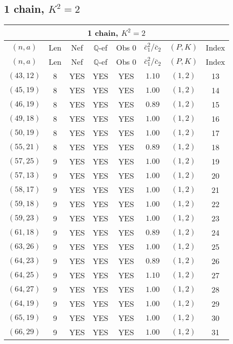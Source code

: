 \subsection{1 chain, $K^2 = 2$}
\begin{longtable}{|c|c|c|c|c|c|c|c|}
\hline
\multicolumn{8}{|c|}{1 chain, $K^2 = 2$}\\
\hline
$(n,a)$ & Len & Nef & $\mathbb Q$-ef & Obs 0 & $\overline c_1^2 / \overline c_2$ & $(P,K)$ & Index\\
\hline
\endfirsthead

\hline
$(n,a)$ & Len & Nef & $\mathbb Q$-ef & Obs 0 & $\overline c_1^2 / \overline c_2$ & $(P,K)$ & Index\\
\hline
\endhead
\hline
\endfoot

$(43,12)$ & 8 & YES & YES & YES & $1.10$ & $(1,2)$ & 13\\
$(45,19)$ & 8 & YES & YES & YES & $1.00$ & $(1,2)$ & 14\\
$(46,19)$ & 8 & YES & YES & YES & $0.89$ & $(1,2)$ & 15\\
$(49,18)$ & 8 & YES & YES & YES & $1.00$ & $(1,2)$ & 16\\
$(50,19)$ & 8 & YES & YES & YES & $1.00$ & $(1,2)$ & 17\\
$(55,21)$ & 8 & YES & YES & YES & $0.89$ & $(1,2)$ & 18\\
$(57,25)$ & 9 & YES & YES & YES & $1.00$ & $(1,2)$ & 19\\
$(57,13)$ & 9 & YES & YES & YES & $1.00$ & $(1,2)$ & 20\\
$(58,17)$ & 9 & YES & YES & YES & $1.00$ & $(1,2)$ & 21\\
$(59,18)$ & 9 & YES & YES & YES & $1.00$ & $(1,2)$ & 22\\
$(59,23)$ & 9 & YES & YES & YES & $1.00$ & $(1,2)$ & 23\\
$(61,18)$ & 9 & YES & YES & YES & $0.89$ & $(1,2)$ & 24\\
$(63,26)$ & 9 & YES & YES & YES & $1.00$ & $(1,2)$ & 25\\
$(64,23)$ & 9 & YES & YES & YES & $0.89$ & $(1,2)$ & 26\\
$(64,25)$ & 9 & YES & YES & YES & $1.10$ & $(1,2)$ & 27\\
$(64,27)$ & 9 & YES & YES & YES & $1.00$ & $(1,2)$ & 28\\
$(64,19)$ & 9 & YES & YES & YES & $1.00$ & $(1,2)$ & 29\\
$(65,19)$ & 9 & YES & YES & YES & $1.00$ & $(1,2)$ & 30\\
$(66,29)$ & 9 & YES & YES & YES & $1.00$ & $(1,2)$ & 31\\

\end{longtable}
